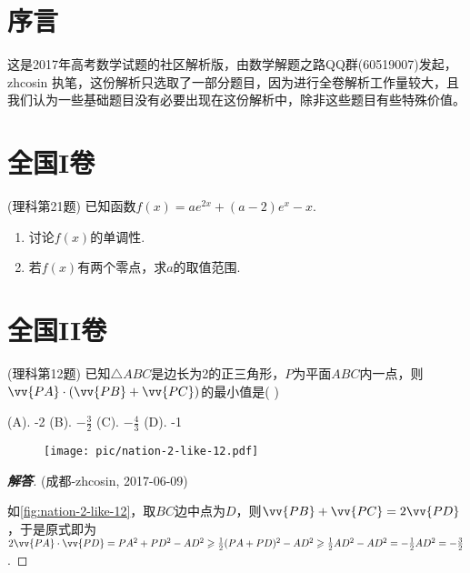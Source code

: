 \documentclass{ctexart}
\title{\kaishu{2017年高考数学试题选析}}
\author{数学解题之路QQ群(60519007)}
\date{更新于: \today}
\begin{document}
\maketitle

\tableofcontents

\section{序言}
\label{sec:preface}

这是2017年高考数学试题的社区解析版，由数学解题之路QQ群(60519007)发起，zhcosin 执笔，这份解析只选取了一部分题目，因为进行全卷解析工作量较大，且我们认为一些基础题目没有必要出现在这份解析中，除非这些题目有些特殊价值。

\section{全国I卷}
\label{sec:nation-1}

\begin{exercise}(理科第21题)
  已知函数$f(x)=ae^{2x}+(a-2)e^x-x$.
  \begin{enumerate}
  \item 讨论$f(x)$的单调性.
  \item 若$f(x)$有两个零点，求$a$的取值范围.
  \end{enumerate}
\end{exercise}

\section{全国II卷}
\label{sec:nation-2}

\begin{exercise}(理科第12题)
  已知$\triangle ABC$是边长为2的正三角形，$P$为平面$ABC$内一点，则$\vv{PA} \cdot (\vv{PB}+\vv{PC})$的最小值是(    )

  (A). -2             (B). $-\frac{3}{2}$          (C). $-\frac{4}{3}$        (D). -1
\end{exercise}

\begin{figure}[htbp]
  \centering
\texttt{[image: pic/nation-2-like-12.pdf]}
\caption{}
\label{fig:nation-2-like-12}
\end{figure}

\begin{proof}[\textbf{解答}](成都-zhcosin, 2017-06-09)

  如\autoref{fig:nation-2-like-12}，取$BC$边中点为$D$，则$\vv{PB}+\vv{PC}=2\vv{PD}$，于是原式即为$2\vv{PA}\cdot \vv{PD}=PA^2+PD^2-AD^2 \geqslant \frac{1}{2}(PA+PD)^2 - AD^2 \geqslant \frac{1}{2}AD^2 -  AD^2 = - \frac{1}{2} AD^2 = -\frac{3}{2}$.
\end{proof}
\end{document}
